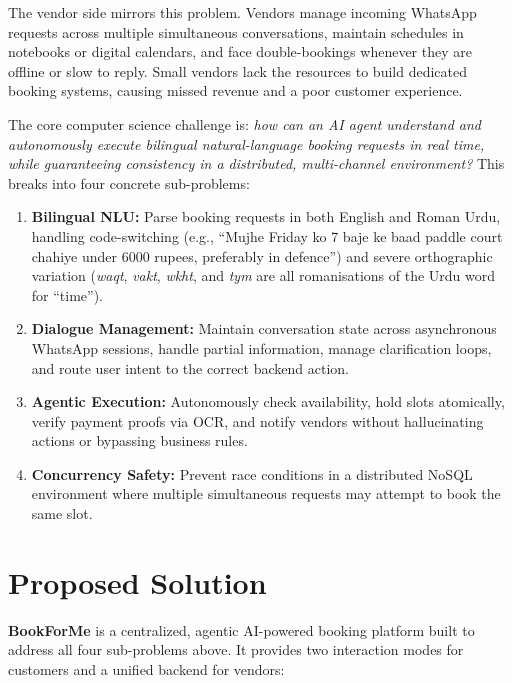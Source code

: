 The vendor side mirrors this problem. Vendors manage incoming WhatsApp requests
across multiple simultaneous conversations, maintain schedules in notebooks or
digital calendars, and face double-bookings whenever they are offline or slow to
reply. Small vendors lack the resources to build dedicated booking systems,
causing missed revenue and a poor customer experience.

The core computer science challenge is: \textit{how can an AI agent understand
and autonomously execute bilingual natural-language booking requests in real
time, while guaranteeing consistency in a distributed, multi-channel
environment?} This breaks into four concrete sub-problems:

\begin{enumerate}
  \item \textbf{Bilingual NLU:} Parse booking requests in both English and Roman
        Urdu, handling code-switching (e.g., ``Mujhe Friday ko 7 baje ke baad
        paddle court chahiye under 6000 rupees, preferably in defence'') and
        severe orthographic variation (\textit{waqt}, \textit{vakt},
        \textit{wkht}, and \textit{tym} are all romanisations of the Urdu word
        for ``time'').
  \item \textbf{Dialogue Management:} Maintain conversation state across
        asynchronous WhatsApp sessions, handle partial information, manage
        clarification loops, and route user intent to the correct backend action.
  \item \textbf{Agentic Execution:} Autonomously check availability, hold slots
        atomically, verify payment proofs via OCR, and notify vendors without
        hallucinating actions or bypassing business rules.
  \item \textbf{Concurrency Safety:} Prevent race conditions in a distributed
        NoSQL environment where multiple simultaneous requests may attempt to
        book the same slot.
\end{enumerate}

\section{Proposed Solution}
\label{sec:intro-solution}

\textbf{BookForMe} is a centralized, agentic AI-powered booking platform built
to address all four sub-problems above. It provides two interaction modes for
customers and a unified backend for vendors:

